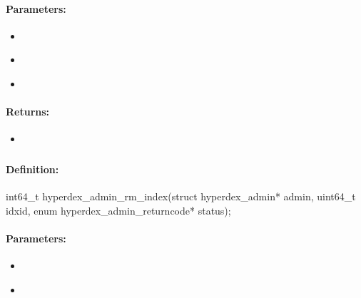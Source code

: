 \paragraph{Parameters:}
\begin{itemize}[noitemsep]
\item {}\\

\item {}\\

\item {}\\

\end{itemize}

\paragraph{Returns:}
\begin{itemize}[noitemsep]
\item {}\\

\end{itemize}

\pagebreak
\subsubsection{}
\label{api:c:rm_index}


\paragraph{Definition:}
\begin{ccode}
int64_t hyperdex_admin_rm_index(struct hyperdex_admin* admin,
        uint64_t idxid,
        enum hyperdex_admin_returncode* status);
\end{ccode}

\paragraph{Parameters:}
\begin{itemize}[noitemsep]
\item {}\\

\item {}\\

\end{itemize}

